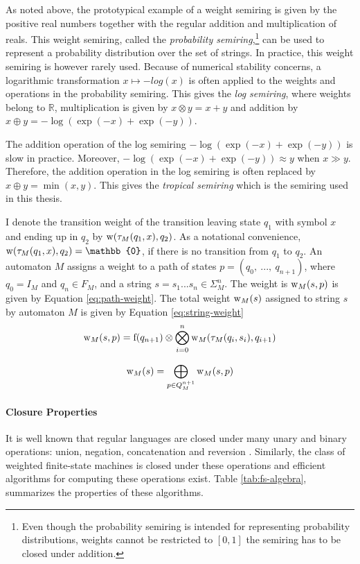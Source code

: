 As noted above, the prototypical example of a weight semiring is given by the positive real numbers together with the regular addition and multiplication of reals. This weight semiring, called the {\it probability semiring},\footnote{Even though the probability semiring is intended for representing probability distributions, weights cannot be restricted to $[0,1]$ the semiring has to be closed under addition.}  can be used to represent a probability distribution over the set of strings. In practice, this weight semiring is however rarely used. Because of numerical stability concerns, a logarithmic transformation $x \mapsto -log(x)$ is often applied to the weights and operations in the probability semiring. This gives the {\it log semiring}, where weights belong to $\mathbb{R}$, multiplication is given by $x \otimes y = x + y$ and addition by $x \oplus y = -\log(\exp(-x) + \exp(-y))$.

The addition operation of the log semiring $-\log(\exp(-x) + \exp(-y))$
is slow in practice. Moreover, $-\log(\exp(-x) + \exp(-y)) \approx y$
when $x \gg y$. Therefore, the addition operation in the log semiring
is often replaced by $x \oplus y = \min(x,y)$. This gives the {\it
  tropical semiring} which is the semiring used in this thesis.

I denote the transition weight of the transition leaving state $q_1$
with symbol $x$ and ending up in $q_2$ by $\mbox{${\rm w}$}(\tau_M(q_1,x), q_2)$. As
a notational convenience, $\w(\tau_M(q_1,x), q_2) = \mathbb{0}$, if
there is no transition from $q_1$ to $q_2$. An automaton $M$ assigns a
weight to a path of states $p = (q_0,\ ...,\ q_{n+1})$, where $q_0 =
I_M$ and $q_n \in F_M$, and a string $s = s_1...s_n \in
\Sigma_M^{n}$. The weight is $\mbox{${\rm w}$}_M(s,p)$ is given by Equation
\ref{eq:path-weight}. The total weight $\mbox{${\rm w}$}_M(s)$ assigned to string
$s$ by automaton $M$ is given by Equation \ref{eq:string-weight}
\begin{equation}
\mbox{${\rm w}$}_M(s,p) =
{\rm f}(q_{n+1})\otimes \bigotimes_{i = 0}^n \mbox{${\rm w}$}_M(\tau_M(q_i,s_i), q_{i+1})\label{eq:path-weight}
\end{equation}

\begin{equation}
\mbox{${\rm w}$}_M(s) =
\bigoplus_{p \in Q_M^{n+1}} \mbox{${\rm w}$}_M(s,p) \label{eq:string-weight}
\end{equation}

\paragraph{Closure Properties} It is well known that regular languages
are closed under many unary and binary operations: union, negation,
concatenation and reversion \citep{Sipser1996}. Similarly, the class
of weighted finite-state machines is closed under these operations and efficient algorithms for computing these operations exist. Table
\ref{tab:fs-algebra}, summarizes the properties of these algorithms.

